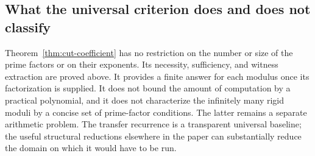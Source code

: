 \subsection{What the universal criterion does and does not classify}

Theorem~\ref{thm:cut-coefficient} has no restriction on the number or size
of the prime factors or on their exponents.  Its necessity, sufficiency,
and witness extraction are proved above.  It provides a finite answer
for each modulus once its factorization is supplied.  It does not bound
the amount of computation by a practical polynomial, and it does not
characterize the infinitely many rigid moduli by a concise set of
prime-factor conditions.  The latter remains a separate arithmetic
problem.  The transfer recurrence is a transparent universal baseline;
the useful structural reductions elsewhere in the paper can substantially
reduce the domain on which it would have to be run.

